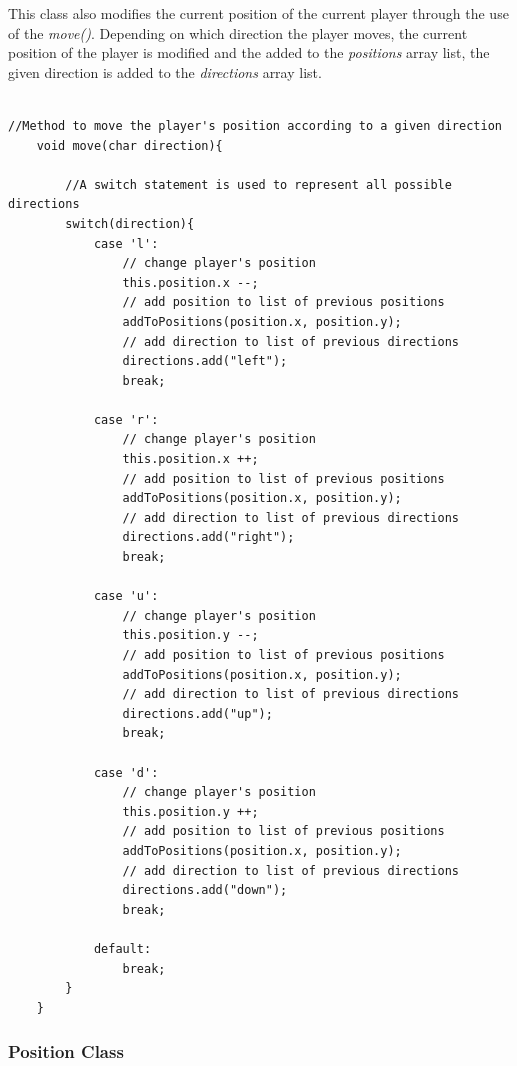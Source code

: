 \documentclass[a4paper,12pt]{extarticle}
\begin{document}
\newpage
\noindent This class also modifies the current position of the current player through the use of the \textit{move()}. Depending on which direction the player moves, the current position of the player is modified and the added to the \textit{positions} array list, the given direction is added to the \textit{directions} array list.

\begin{lstlisting}

//Method to move the player's position according to a given direction
    void move(char direction){

        //A switch statement is used to represent all possible directions
        switch(direction){
            case 'l':
                // change player's position
                this.position.x --;
                // add position to list of previous positions
                addToPositions(position.x, position.y);
                // add direction to list of previous directions
                directions.add("left");
                break;

            case 'r':
                // change player's position
                this.position.x ++;
                // add position to list of previous positions
                addToPositions(position.x, position.y);
                // add direction to list of previous directions
                directions.add("right");
                break;

            case 'u':
                // change player's position
                this.position.y --;
                // add position to list of previous positions
                addToPositions(position.x, position.y);
                // add direction to list of previous directions
                directions.add("up");
                break;

            case 'd':
                // change player's position
                this.position.y ++;
                // add position to list of previous positions
                addToPositions(position.x, position.y);
                // add direction to list of previous directions
                directions.add("down");
                break;

            default:
                break;
        }
    }

\end{lstlisting}
\vspace{4mm}

\subsubsection{Position Class}
\end{document}
